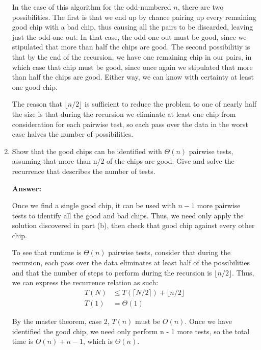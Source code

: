 \documentclass[]{book}
\theoremstyle{definition}
\begin{document}
\begin{enumerate}[label=\alph*.]
        In the case of this algorithm for the
        odd-numbered $n$, there are two possibilities. The first is that we end up by chance pairing up
        every remaining good chip with a bad chip, thus causing all the pairs to be discarded, leaving
        just the odd-one out. In that case, the odd-one out must be good, since we stipulated 
        that more than half the chips are good. The second possibilitiy is
        that by the end of the recursion, we have one remaining chip in our pairs,
        in which case that chip must be good, since once again we stipulated that
        more than half the chips are good. Either way, we can know
        with certainty at least one good chip.

        The reason that $\lfloor n/2 \rfloor$ is sufficient to reduce the problem to one of 
        nearly half the size is that during the recursion we eliminate at least one 
        chip from consideration for each pairwise test, so each pass over the data in the worst case
        halves the number of possibilities.
        
    \item Show that the good chips can be identified with $\Theta(n)$ pairwise tests, assuming that 
          more than n/2 of the chips are good. Give and solve the recurrence that describes the
          number of tests.

    \textbf{Answer:} 
    
    Once we find a single good chip, it can be used with $n-1$ more pairwise tests
    to identify all the good and bad chips. Thus, we need only apply the solution discovered
    in part (b), then check that good chip against every other chip.

    To see that runtime is $\Theta(n)$ pairwise tests, consider that during the recursion,
    each pass over the data eliminates at least half of the possibilities and that
    the number of steps to perform during the recursion is $\lfloor n / 2 \rfloor$. Thus,
    we can express the recurrence relation as such:
    \begin{align*}
        T(N) &\leq T(\lceil N/2 \rceil) + \lfloor n / 2 \rfloor \\
        T(1) &= \Theta(1)
    \end{align*}

    By the master theorem, case 2, $T(n)$ must be $O(n)$. Once we have identified the good chip,
    we need only perform n - 1 more tests, so the total time is $O(n) + n -1$, which is $\Theta(n)$.

\end{enumerate}
\end{document}
